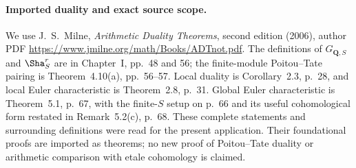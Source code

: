 \paragraph{Imported duality and exact source scope.}
We use J.~S.~Milne, \emph{Arithmetic Duality Theorems},
second edition (2006), author PDF
\url{https://www.jmilne.org/math/Books/ADTnot.pdf}.
The definitions of $G_{\mathbf Q,S}$ and $\Sha^r_S$ are in
Chapter~I, pp.~48 and 56; the finite-module Poitou--Tate
pairing is Theorem~4.10(a), pp.~56--57.
Local duality is Corollary~2.3, p.~28, and local Euler
characteristic is Theorem~2.8, p.~31.
Global Euler characteristic is Theorem~5.1, p.~67, with
the finite-$S$ setup on p.~66 and its useful cohomological
form restated in Remark~5.2(c), p.~68.
These complete statements and surrounding definitions were
read for the present application.  Their foundational proofs
are imported as theorems; no new proof of Poitou--Tate duality
or arithmetic comparison with etale cohomology is claimed.
